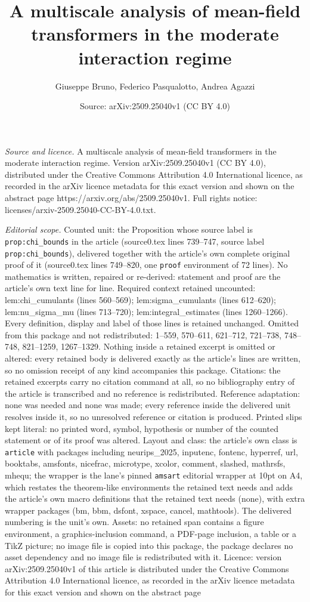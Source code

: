 \documentclass[10pt,a4paper]{amsart}
\title[A multiscale analysis of mean-field transformers in the mode]{A multiscale analysis of mean-field transformers in the moderate interaction regime}
\author{Giuseppe Bruno, Federico Pasqualotto, Andrea Agazzi}
\date{Source: arXiv:2509.25040v1 (CC BY 4.0)}
\begin{document}
\maketitle

\noindent\emph{Source and licence.} A multiscale analysis of mean-field transformers in the moderate interaction regime. Version arXiv:2509.25040v1 (CC BY 4.0), distributed under the Creative Commons Attribution 4.0 International licence, as recorded in the arXiv licence metadata for this exact version and shown on the abstract page https://arxiv.org/abs/2509.25040v1. Full rights notice: licenses/arxiv-2509.25040-CC-BY-4.0.txt.\par\smallskip

\noindent\textit{Editorial scope.} Counted unit: the Proposition whose source label is \texttt{prop:chi\_bounds} in the article (source0.tex lines 739--747, source label \texttt{prop:chi\_bounds}), delivered together with the article's own complete original proof of it (source0.tex lines 749--820, one \texttt{proof} environment of 72 lines). No mathematics is written, repaired or re-derived: statement and proof are the article's own text line for line. Required context retained uncounted: lem:chi\_cumulants (lines 560--569); lem:sigma\_cumulants (lines 612--620); lem:nu\_sigma\_mu (lines 713--720); lem:integral\_estimates (lines 1260--1266). Every definition, display and label of those lines is retained unchanged. Omitted from this package and not redistributed: 1--559, 570--611, 621--712, 721--738, 748--748, 821--1259, 1267--1329. Nothing inside a retained excerpt is omitted or altered: every retained body is delivered exactly as the article's lines are written, so no omission receipt of any kind accompanies this package. Citations: the retained excerpts carry no citation command at all, so no bibliography entry of the article is transcribed and no reference is redistributed. Reference adaptation: none was needed and none was made; every reference inside the delivered unit resolves inside it, so no unresolved reference or citation is produced. Printed slips kept literal: no printed word, symbol, hypothesis or number of the counted statement or of its proof was altered. Layout and class: the article's own class is \texttt{article} with packages including neurips\_2025, inputenc, fontenc, hyperref, url, booktabs, amsfonts, nicefrac, microtype, xcolor, comment, slashed, mathrsfs, mhequ; the wrapper is the lane's pinned \texttt{amsart} editorial wrapper at 10pt on A4, which restates the theorem-like environments the retained text needs and adds the article's own macro definitions that the retained text needs (none), with extra wrapper packages (bm, bbm, dsfont, xspace, cancel, mathtools). The delivered numbering is the unit's own. Assets: no retained span contains a figure environment, a graphics-inclusion command, a PDF-page inclusion, a table or a TikZ picture; no image file is copied into this package, the package declares no asset dependency and no image file is redistributed with it. Licence: version arXiv:2509.25040v1 of this article is distributed under the Creative Commons Attribution 4.0 International licence, as recorded in the arXiv licence metadata for this exact version and shown on the abstract page 
\end{document}
